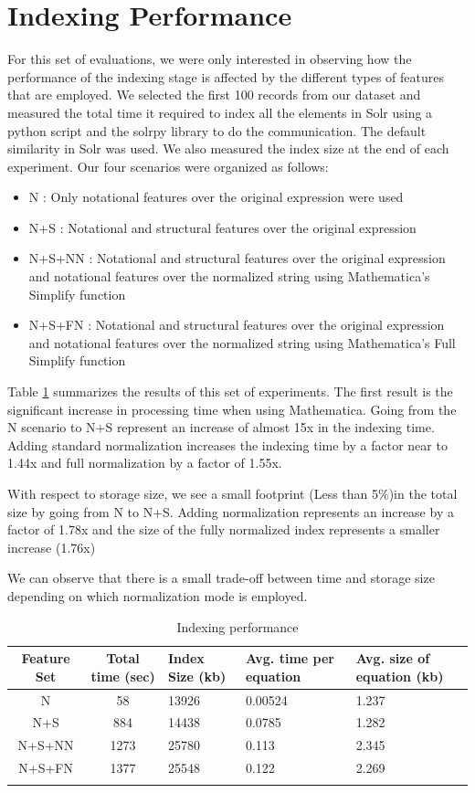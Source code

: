 \section{Indexing Performance}
For this set of evaluations, we were only interested in observing how the performance of the indexing stage is affected by the different types of features that are employed. We selected the first 100 records from our dataset and measured the total time it required to index all the elements in Solr using a python script and the solrpy library to do the communication. The default similarity in Solr was used. We also measured the index size at the end of each experiment.
Our four scenarios were organized as follows:
\begin{itemize}
\item N : Only notational features over the original expression were used
\item N+S : Notational and structural features over the original expression
\item N+S+NN : Notational and structural features over the original expression and notational features over the normalized string using Mathematica's Simplify function
\item N+S+FN : Notational and structural features over the original expression and notational features over the normalized string using Mathematica's Full Simplify function
\end{itemize}

Table \ref{indexing_performance} summarizes the results of this set of experiments. The first result is the significant increase in processing time when using Mathematica. Going from the N scenario to N+S represent an increase of almost 15x in the indexing time. Adding standard normalization increases the indexing time by a factor near to 1.44x and full normalization by a factor of 1.55x.

With respect to storage size, we see a small footprint (Less than 5\%)in the total size by going from N to N+S. Adding normalization represents an increase by a factor of 1.78x and the size of the fully normalized index represents a smaller increase (1.76x)

We can observe that there is a small trade-off between time and storage size depending on which normalization mode is employed.

\begin{longtable}{|c|c|p{2cm}|p{2cm}|p{2cm}|}
\hline 
Feature Set & Total time (sec) & Index Size (kb) & Avg. time per equation & Avg. size of equation (kb) \\ 
\hline 
N & 58 & 13926 & 0.00524 & 1.237 \\ 
\hline 
N+S & 884 & 14438 & 0.0785 & 1.282 \\ 
\hline 
N+S+NN & 1273 & 25780 & 0.113 & 2.345 \\ 
\hline 
N+S+FN & 1377 & 25548 & 0.122 & 2.269 \\ 
\hline
\caption{Indexing performance}
\label{indexing_performance}
\end{longtable} 



